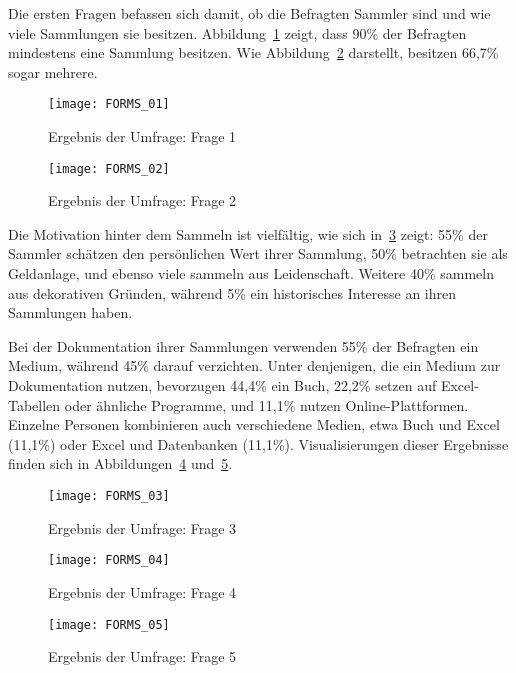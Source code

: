 Die ersten Fragen befassen sich damit, ob die Befragten Sammler sind und wie viele Sammlungen sie besitzen.
Abbildung~\ref{fig:forms_result_01} zeigt, dass 90\% der Befragten mindestens eine Sammlung besitzen.
Wie Abbildung~\ref{fig:forms_result_02} darstellt, besitzen 66,7\% sogar mehrere.

\begin{figure}[h]
    \centering
    \texttt{[image: FORMS\_01]}
    \caption{Ergebnis der Umfrage: Frage 1}
    \label{fig:forms_result_01}
\end{figure}

\newpage
\begin{figure}[h]
    \centering
    \texttt{[image: FORMS\_02]}
    \caption{Ergebnis der Umfrage: Frage 2}
    \label{fig:forms_result_02}
\end{figure}

Die Motivation hinter dem Sammeln ist vielfältig, wie sich in~\ref{fig:forms_result_03} zeigt: 55\% der Sammler schätzen den persönlichen Wert ihrer Sammlung, 50\% betrachten sie als Geldanlage, und ebenso viele sammeln aus Leidenschaft.
Weitere 40\% sammeln aus dekorativen Gründen, während 5\% ein historisches Interesse an ihren Sammlungen haben. \par

Bei der Dokumentation ihrer Sammlungen verwenden 55\% der Befragten ein Medium, während 45\% darauf verzichten.
Unter denjenigen, die ein Medium zur Dokumentation nutzen, bevorzugen 44,4\% ein Buch, 22,2\% setzen auf Excel-Tabellen oder ähnliche Programme, und 11,1\% nutzen Online-Plattformen.
Einzelne Personen kombinieren auch verschiedene Medien, etwa Buch und Excel (11,1\%) oder Excel und Datenbanken (11,1\%).
Visualisierungen dieser Ergebnisse finden sich in Abbildungen~\ref{fig:forms_result_04} und~\ref{fig:forms_result_05}.

\newpage

\begin{figure}[h!]
    \centering
    \texttt{[image: FORMS\_03]}
    \caption{Ergebnis der Umfrage: Frage 3}
    \label{fig:forms_result_03}
\end{figure}

\begin{figure}[h!]
    \centering
    \texttt{[image: FORMS\_04]}
    \caption{Ergebnis der Umfrage: Frage 4}
    \label{fig:forms_result_04}
\end{figure}
\begin{figure}[h!]
    \centering
    \texttt{[image: FORMS\_05]}
    \caption{Ergebnis der Umfrage: Frage 5}
    \label{fig:forms_result_05}
\end{figure}


